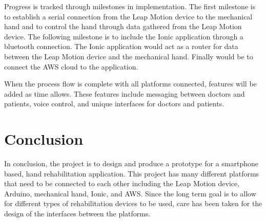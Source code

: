 \documentclass[a4paper,10pt]{article}
\begin{document}
            Progress is tracked through milestones in implementation. The first milestone is to establish a serial connection from the Leap Motion device to the mechanical hand and to control the hand through data gathered from the Leap Motion device. The following milestone is to include the Ionic application through a bluetooth connection. The Ionic application would act as a router for data between the Leap Motion device and the mechanical hand. Finally would be to connect the AWS cloud to the application.

            When the process flow is complete with all platforms connected, features will be added as time allows. These features include messaging between doctors and patients, voice control, and unique interfaces for doctors and patients.

\section{Conclusion}

          In conclusion, the project is to design and produce a prototype for a smartphone based, hand rehabilitation application. This project has many different platforms that need to be connected to each other including the Leap Motion device, Arduino, mechanical hand, Ionic, and AWS. Since the long term goal is to allow for different types of rehabilitation devices to be used, care has been taken for the design of the interfaces between the platforms.
\end{document}
